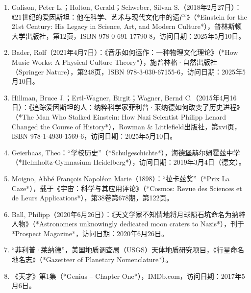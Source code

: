 \begin{enumerate}
\item Galison, Peter L.；Holton, Gerald；Schweber, Silvan S.（2018年2月27日）：《21世纪的爱因斯坦：他在科学、艺术与现代文化中的遗产》（*Einstein for the 21st Century: His Legacy in Science, Art, and Modern Culture*），普林斯顿大学出版社，第12页，ISBN 978-0-691-17790-8，访问日期：2025年5月10日。

\item Bader, Rolf（2021年4月7日）：《音乐如何运作：一种物理文化理论》（*How Music Works: A Physical Culture Theory*），施普林格·自然出版社（Springer Nature），第248页，ISBN 978-3-030-67155-6，访问日期：2025年5月10日。

\item Hillman, Bruce J.；Ertl-Wagner, Birgit；Wagner, Bernd C.（2015年4月16日）：《追踪爱因斯坦的人：纳粹科学家菲利普·莱纳德如何改变了历史进程》（*The Man Who Stalked Einstein: How Nazi Scientist Philipp Lenard Changed the Course of History*），Rowman & Littlefield出版社，第xvi页，ISBN 978-1-4930-1569-6，访问日期：2025年5月10日。

\item Geierhaas, Theo：“学校历史”（*Schulgeschichte*），海德堡赫尔姆霍兹中学（*Helmholtz-Gymnasium Heidelberg*），访问日期：2019年3月4日（德文）。

\item Moigno, Abbé François Napoléon Marie（1898）：“拉卡兹奖”（*Prix La Caze*），载于《宇宙：科学与其应用评论》（*Cosmos: Revue des Sciences et de Leurs Applications*），第38卷第678期，第122页。

\item Ball, Philipp（2020年6月26日）：《天文学家不知情地将月球陨石坑命名为纳粹人物》（*Astronomers unknowingly dedicated moon craters to Nazis*），刊于 *Prospect Magazine*，访问日期：2020年6月26日。

\item “菲利普·莱纳德”，美国地质调查局（USGS）天体地质研究项目，《行星命名地名志》（*Gazetteer of Planetary Nomenclature*）。

\item 《天才》第1集（*Genius – Chapter One*），IMDb.com，访问日期：2017年5月6日。

\end{enumerate}
